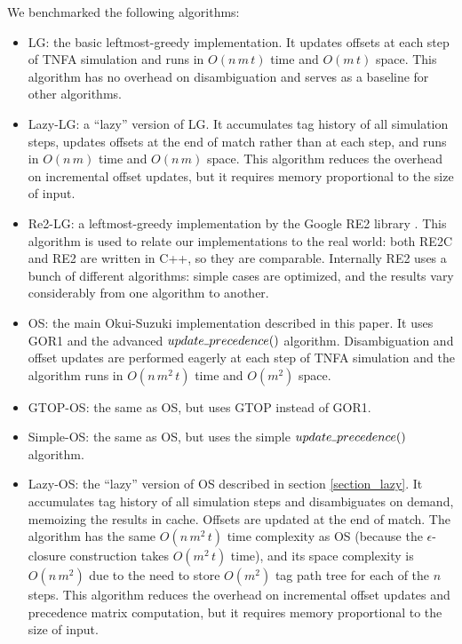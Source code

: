 \documentclass[AMA,STIX1COL]{WileyNJD-v2}
\newcommand{\Xund}{\rule{.4em}{.4pt}}
\begin{document}
We benchmarked the following algorithms:
\begin{itemize}[itemsep=0.2em, topsep=0.5em]
\item LG: the basic leftmost-greedy implementation.
    It updates offsets at each step of TNFA simulation
    and runs in $O(n \, m \, t)$ time and $O(m \, t)$ space.
    This algorithm has no overhead on disambiguation
    and serves as a baseline for other algorithms.

\item Lazy-LG: a ``lazy'' version of LG.
    It accumulates tag history of all simulation steps,
    updates offsets at the end of match rather than at each step,
    and runs in $O(n \, m)$ time and $O(n \, m)$ space.
    This algorithm reduces the overhead on incremental offset updates,
    but it requires memory proportional to the size of input.

\item Re2-LG: a leftmost-greedy implementation by the Google RE2 library \cite{RE2}.
    This algorithm is used to relate our implementations to the real world:
    both RE2C and RE2 are written in C++, so they are comparable.
    Internally RE2 uses a bunch of different algorithms:
    simple cases are optimized,
    and the results vary considerably from one algorithm to another.

\item OS: the main Okui-Suzuki implementation described in this paper.
    It uses GOR1 and the advanced $update \Xund precedence()$ algorithm.
    Disambiguation and offset updates are performed eagerly at each step of TNFA simulation
    and the algorithm runs in $O(n \, m^2 \, t)$ time and $O(m^2)$ space.

\item GTOP-OS: the same as OS, but uses GTOP instead of GOR1.

\item Simple-OS: the same as OS, but uses the simple $update \Xund precedence()$ algorithm.

\item Lazy-OS: the ``lazy'' version of OS described in section \ref{section_lazy}.
    It accumulates tag history of all simulation steps and
    disambiguates on demand, memoizing the results in cache.
    Offsets are updated at the end of match.
    The algorithm has the same $O(n \, m^2 \, t)$ time complexity as OS (because the $\epsilon$-closure construction takes $O(m^2 \, t)$ time),
    and its space complexity is $O(n \, m^2)$ due to the need to store $O(m^2)$ tag path tree for each of the $n$ steps.
    This algorithm reduces the overhead on incremental offset updates and precedence matrix computation,
    but it requires memory proportional to the size of input.


\end{itemize}
\end{document}
